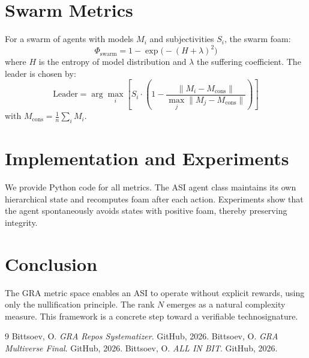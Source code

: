 \documentclass{article}
\begin{document}
\section{Swarm Metrics}
For a swarm of agents with models $M_i$ and subjectivities $S_i$, the swarm foam:
\[
\Phi_{\text{swarm}} = 1 - \exp\bigl(-(H + \lambda)^2\bigr)
\]
where $H$ is the entropy of model distribution and $\lambda$ the suffering coefficient. The leader is chosen by:
\[
\text{Leader} = \arg\max_i \left[ S_i \cdot \left(1 - \frac{\|M_i - M_{\text{cons}}\|}{\max_j \|M_j - M_{\text{cons}}\|}\right) \right]
\]
with $M_{\text{cons}} = \frac{1}{n}\sum_i M_i$.

\section{Implementation and Experiments}
We provide Python code for all metrics. The ASI agent class maintains its own hierarchical state and recomputes foam after each action. Experiments show that the agent spontaneously avoids states with positive foam, thereby preserving integrity.

\section{Conclusion}
The GRA metric space enables an ASI to operate without explicit rewards, using only the nullification principle. The rank $N$ emerges as a natural complexity measure. This framework is a concrete step toward a verifiable technosignature.

\begin{thebibliography}{9}
 Bittsoev, O. \textit{GRA Repos Systematizer}. GitHub, 2026.
 Bittsoev, O. \textit{GRA Multiverse Final}. GitHub, 2026.
 Bittsoev, O. \textit{ALL IN BIT}. GitHub, 2026.
\end{thebibliography}
\end{document}
